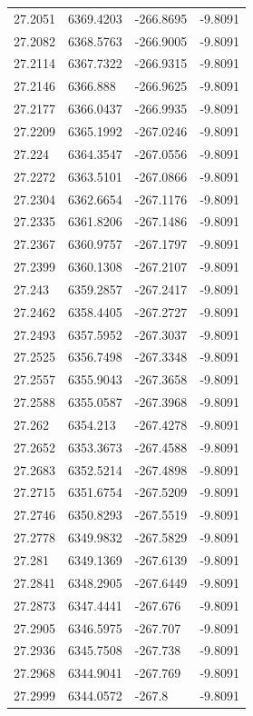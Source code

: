 \begin{table}[H]
\begin{tabular}{llll}
27.2051 & 6369.4203 & -266.8695 & -9.8091 \\
27.2082 & 6368.5763 & -266.9005 & -9.8091 \\
27.2114 & 6367.7322 & -266.9315 & -9.8091 \\
27.2146 & 6366.888 & -266.9625 & -9.8091 \\
27.2177 & 6366.0437 & -266.9935 & -9.8091 \\
27.2209 & 6365.1992 & -267.0246 & -9.8091 \\
27.224 & 6364.3547 & -267.0556 & -9.8091 \\
27.2272 & 6363.5101 & -267.0866 & -9.8091 \\
27.2304 & 6362.6654 & -267.1176 & -9.8091 \\
27.2335 & 6361.8206 & -267.1486 & -9.8091 \\
27.2367 & 6360.9757 & -267.1797 & -9.8091 \\
27.2399 & 6360.1308 & -267.2107 & -9.8091 \\
27.243 & 6359.2857 & -267.2417 & -9.8091 \\
27.2462 & 6358.4405 & -267.2727 & -9.8091 \\
27.2493 & 6357.5952 & -267.3037 & -9.8091 \\
27.2525 & 6356.7498 & -267.3348 & -9.8091 \\
27.2557 & 6355.9043 & -267.3658 & -9.8091 \\
27.2588 & 6355.0587 & -267.3968 & -9.8091 \\
27.262 & 6354.213 & -267.4278 & -9.8091 \\
27.2652 & 6353.3673 & -267.4588 & -9.8091 \\
27.2683 & 6352.5214 & -267.4898 & -9.8091 \\
27.2715 & 6351.6754 & -267.5209 & -9.8091 \\
27.2746 & 6350.8293 & -267.5519 & -9.8091 \\
27.2778 & 6349.9832 & -267.5829 & -9.8091 \\
27.281 & 6349.1369 & -267.6139 & -9.8091 \\
27.2841 & 6348.2905 & -267.6449 & -9.8091 \\
27.2873 & 6347.4441 & -267.676 & -9.8091 \\
27.2905 & 6346.5975 & -267.707 & -9.8091 \\
27.2936 & 6345.7508 & -267.738 & -9.8091 \\
27.2968 & 6344.9041 & -267.769 & -9.8091 \\
27.2999 & 6344.0572 & -267.8 & -9.8091 \\

\end{tabular}
\end{table}
